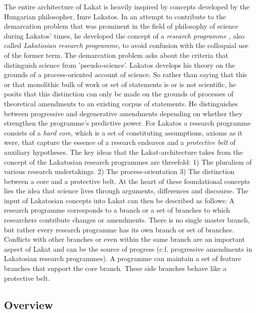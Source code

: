 The entire architecture of Lakat is heavily inspired by concepts developed by the Hungarian philosopher, Imre Lakatos. In an attempt to contribute to the demarcation problem \cite{popper1959logic,lakatos1978falsification,feyerabend1975against,pigliucci2013demarcation} that was prominent in the field of philosophy of science during Lakatos' times, he developed the concept of a \textit{research programme} \cite{lakatos1980methodology, worrall1980methodology, gavroglu1989imre}, also called \textit{Lakatosian research programme}, to avoid confusion with the colloquial use of the former term. The demarcation problem asks about the criteria that distinguish science from 'pseudo-science'. Lakatos develops his theory on the grounds of a process-oriented account of science. So rather than saying that this or that monolithic bulk of work or set of statements is or is not scientific, he posits that this distinction can only be made on the grounds of processes of theoretical amendments to an existing corpus of statements. He distinguishes between progressive and degenerative amendments depending on whether they strengthen the programme's predictive power. For Lakatos a research programme consists of a \textit{hard core}, which is a set of constituting assumptions, axioms as it were, that capture the essence of a research endeavor and a \textit{protective belt} of auxiliary hypotheses. The key ideas that the Lakat-architecture takes from the concept of the Lakatosian research programmes are threefold: 1) The pluralism of various research undertakings. 2) The process-orientation 3) The distinction between a core and a protective belt. At the heart of these foundational concepts lies the idea that science lives through arguments, differences and discourse. The input of Lakatosian concepts into Lakat can then be described as follows: A research programme corresponds to a branch or a set of branches to which researchers contribute changes or amendments. There is no single master branch, but rather every research programme has its own branch or set of branches. Conflicts with other branches or even within the same branch are an important aspect of Lakat and can be the source of progress (c.f. progressive amendments in Lakatosian research programmes). A programme can maintain a set of feature branches that support the core branch. These side branches behave like a protective belt.  
% 

\subsection{Overview}

